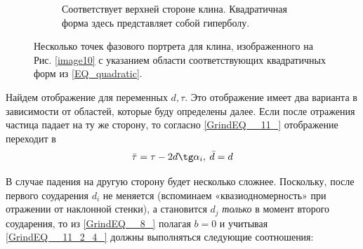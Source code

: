 \documentclass[a4paper]{article}
\begin{document}
\begin{figure}[h!]
\begin{subfigure}[b]{0.4\linewidth}
    \caption{Соответствует верхней стороне клина. Квадратичная форма здесь представляет собой гиперболу.}
    \label{fig:phaseB}
  \end{subfigure}
  \caption{Несколько точек фазового портрета для клина, изображенного на Рис. \ref{image10} с указанием области соответствующих квадратичных форм из \eqref{EQ_quadratic}.}
  \label{fig:phaseAB}
\end{figure}


Найдем  отображение для переменных $d ,\tau$. Это отображение имеет два варианта в зависимости от областей, которые буду определены далее. Если после отражения частица падает на ту же сторону, то согласно \eqref{GrindEQ__11_} отображение переходит в 
\begin{equation}
 \label{GrindEQ__21_6} \bar{\tau }=\tau -2 d \tg \alpha_{i},\:\bar{d}=d
\end{equation}

В случае падения на другую сторону будет несколько сложнее. Поскольку, после первого соударения $d_{i} $ не меняется (вспоминаем «квазиодномерность» при отражении от наклонной стенки), а становится $d_{j} $ \textit{только} в момент второго соударения, то из \eqref{GrindEQ__8_} полагая $b=0$ и учитывая \eqref{GrindEQ__11_2_4_} должны выполняться следующие соотношения:
\end{document}
